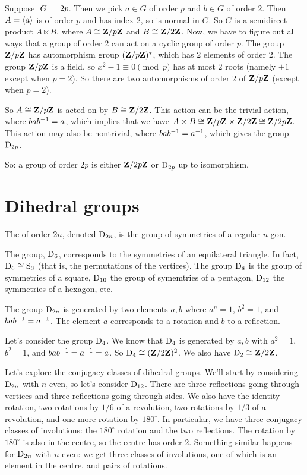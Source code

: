 \documentclass[11pt, oneside]{amsart}
\begin{document}
Suppose $\left \lvert G \right \rvert = 2p$. Then we pick $a\in G$ of order $p$ and $b\in G$ of order $2$. Then $A = \left \langle a \right \rangle$ is of order $p$ and has index $2$, so is normal in $G$. So $G$ is a semidirect product $A\ltimes B$, where $A\cong \mathbf Z / p\mathbf Z$ and $B\cong \mathbf Z / 2\mathbf Z$. Now, we have to figure out all ways that a group of order $2$ can act on a cyclic group of order $p$. The group $\mathbf Z/p\mathbf Z$ has automorphism group $(\mathbf Z/p\mathbf Z)^*$, which has $2$ elements of order $2$. The group $\mathbf Z/p\mathbf Z$ is a field, so $x^2 - 1 \equiv 0 \pmod p$ has at most $2$ roots (namely $\pm 1$ except when $p=2$). So there are two automorphisms of order $2$ of $\mathbf Z/p\mathbf Z$ (except when $p=2$).

So $A\cong \mathbf Z/p\mathbf Z$ is acted on by $B\cong \mathbf Z/2\mathbf Z$. This action can be the trivial action, where $bab^{-1} = a$, which implies that we have $A\times B \cong \mathbf Z/p\mathbf Z\times \mathbf Z/2\mathbf Z\cong \mathbf Z/2p\mathbf Z$. This action may also be nontrivial, where $bab^{-1}  =a^{-1}$, which gives the group $\operatorname{D}_{2p}$.

So: a group of order $2p$ is either $\mathbf Z/2p\mathbf Z$ or $\operatorname{D}_{2p}$ up to isomorphism.

\section{Dihedral groups}
\begin{definition}
The  of order $2n$, denoted $\operatorname{D}_{2n}$, is the group of symmetries of a regular $n$-gon.
\end{definition}

The group, $\operatorname{D}_6$, corresponds to the symmetries of an equilateral triangle. In fact, $\operatorname{D}_6\cong \operatorname{S}_3$ (that is, the permutations of the vertices). The group $\operatorname{D}_8$ is the group of symmetries of a square, $\operatorname{D}_{10}$ the group of symemtries of a pentagon, $\operatorname{D}_{12}$ the symmetries of a hexagon, etc. 

The group $\operatorname{D}_{2n}$ is generated by two elements $a,b$ where $a^n = 1$, $b^2 = 1$, and $bab^{-1} = a^{-1}$. The element $a$ corresponds to a rotation and $b$ to a reflection.

Let's consider the group $\operatorname{D}_4$. We know that $\operatorname{D}_4$ is generated by $a,b$ with $a^2 = 1$, $b^2=1$, and $bab^{-1} = a^{-1} = a$. So $\operatorname{D}_4 \cong (\mathbf Z/2\mathbf Z)^2$. We also have $\operatorname{D}_2 \cong \mathbf Z/2\mathbf Z$.

Let's explore the conjugacy classes of dihedral groups. We'll start by considering $\operatorname{D}_{2n}$ with $n$ even, so let's consider $\operatorname{D}_{12}$. There are three reflections going through vertices and three reflections going through sides. We also have the identity rotation, two rotations by $1/6$ of a revolution, two rotations by $1/3$ of a revolution, and one more rotation by $180^\circ$. In particular, we have three conjugacy classes of involutions: the $180^\circ$ rotation and the two reflections. The rotation by $180^\circ$ is also in the centre, so the centre has order $2$. 
Something similar happens for $\operatorname{D}_{2n}$ with $n$ even: we get three classes of involutions, one of which is an element in the centre, and pairs of rotations. 
\end{document}
